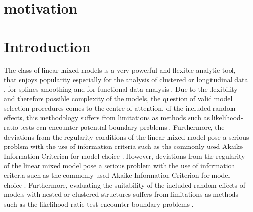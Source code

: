 \section{motivation}
\label{sec:motivation}

%

\section{Introduction}
\setcounter{page}{1}
\label{chap:intro}

The class of linear mixed models \citep{henderson1950estimation} is a very powerful and flexible analytic tool, 
that enjoys popularity especially for the analysis of clustered or longitudinal data \citep{Laird.1982, verbeke2009linear}, 
for splines smoothing \citep{ruppert2003semiparametric, wager2007model} and for functional data analysis 
\citep{di2009multilevel, cederbaum2016functional}. Due to the flexibility and therefore possible complexity of the models, 
the question of valid model selection procedures comes to the centre of attention. 
of the included random effects, this methodology suffers from limitations as methods such as likelihood-ratio tests 
can encounter potential boundary problems \citep{crainiceanu2004likelihood, wood2013simple}. Furthermore, the deviations 
from the regularity conditions of the linear mixed model pose a serious problem with the use of information criteria 
such as the commonly used Akaike Information Criterion \citep{Akaike.1973} for model choice \citep{wager2007model}.
However, deviations from the regularity of the linear mixed model pose a serious problem with the use of information 
criteria such as the commonly used Akaike Information Criterion \citep{Akaike.1973} for model choice \citep{wager2007model}.
Furthermore, evaluating the suitability of the included random effects of models with nested or clustered structures 
suffers from limitations as methods such as the likelihood-ratio test encounter boundary problems \citep{crainiceanu2004likelihood, wood2013simple}.

